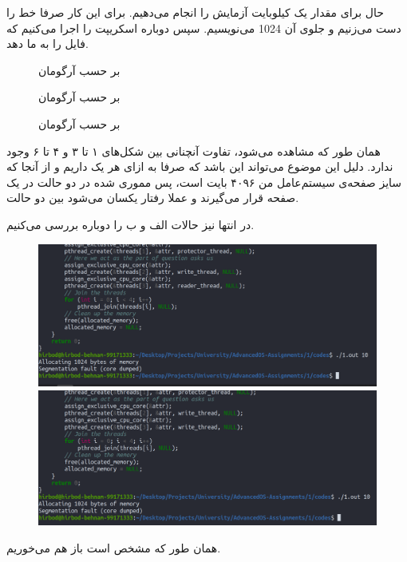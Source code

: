 حال برای مقدار یک کیلوبایت آزمایش را انجام می‌دهیم. برای این کار صرفا خط
را دست می‌زنیم و جلوی آن
1024
می‌نویسیم. سپس دوباره اسکریپت را اجرا می‌کنیم که فایل
را به ما دهد.
\begin{figure}[H]
    \centering
    \caption{ بر حسب آرگومان}
\end{figure}
\begin{figure}[H]
    \centering
    \caption{ بر حسب آرگومان}
\end{figure}
\begin{figure}[H]
    \centering
    \caption{ بر حسب آرگومان}
\end{figure}
همان طور که مشاهده می‌شود،‌ تفاوت آنچنانی بین شکل‌های ۱ تا ۳ و ۴ تا ۶ وجود ندارد.
دلیل این موضوع می‌تواند این باشد که صرفا به ازای هر
یک
داریم و از آنجا که سایز صفحه‌ی سیستم‌عامل من
۴۰۹۶ بایت است، پس مموری
شده در دو حالت در یک صفحه قرار می‌گیرند و عملا رفتار
یکسان می‌شود بین دو حالت.

در انتها نیز حالات
الف و ب را دوباره بررسی می‌کنیم.
\begin{figure}[H]
    \centering
    \includegraphics[scale=0.3]{pics/segfault3.png}
    \includegraphics[scale=0.3]{pics/segfault4.png}
\end{figure}
همان طور که مشخص است باز هم
می‌خوریم.



